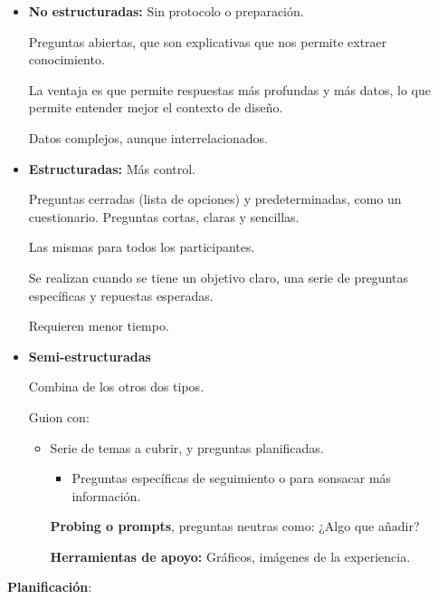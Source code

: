 \documentclass[12pt, twoside, openright]{report} %
\begin{document}
\begin{itemize}
	\item \textbf{No estructuradas:} Sin protocolo o preparación.

	      Preguntas abiertas, que son explicativas que nos permite extraer
	      conocimiento.

	      La ventaja es que permite respuestas más profundas y más datos, lo que
	      permite entender mejor el contexto de diseño.

	      Datos complejos, aunque interrelacionados.
	\item \textbf{Estructuradas:} Más control.

	      Preguntas cerradas (lista de opciones) y predeterminadas, como un
	      cuestionario. Preguntas cortas, claras y sencillas.

	      Las mismas para todos los participantes.

	      Se realizan cuando se tiene un objetivo claro, una serie de preguntas
	      específicas y repuestas esperadas.

	      Requieren menor tiempo.
	\item \textbf{Semi-estructuradas}

	      Combina de los otros dos tipos.

	      Guion con:

	      \begin{itemize}
		      \item Serie de temas a cubrir, y preguntas planificadas.

		            \begin{itemize}
			            \item Preguntas específicas de seguimiento o para sonsacar más
			                  información.
		            \end{itemize}

		            \textbf{Probing o prompts}, preguntas neutras como: ¿Algo que
		            añadir?

		            \textbf{Herramientas de apoyo:} Gráficos, imágenes de la
		            experiencia.
	      \end{itemize}
\end{itemize}

\textbf{Planificación}:
\end{document}
